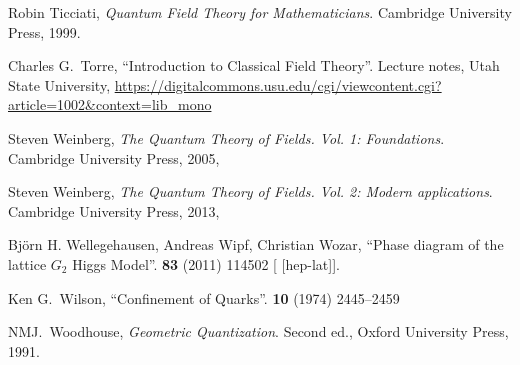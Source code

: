 \begin{thebibliography}{99}
Robin Ticciati,
\textit{Quantum Field Theory for Mathematicians}.
Cambridge University Press, 1999.

Charles G.~Torre,
``Introduction to Classical Field Theory''.
Lecture notes, Utah State University,
\url{https://digitalcommons.usu.edu/cgi/viewcontent.cgi?article=1002&context=lib_mono}





Steven Weinberg,
\textit{The Quantum Theory of Fields. Vol. 1: Foundations}.
Cambridge University Press, 2005,
{\tt{}}

Steven Weinberg,
\textit{The Quantum Theory of Fields. Vol. 2: Modern applications}.
Cambridge University Press, 2013,
{\tt{}}

Bj\"{o}rn H. Wellegehausen, Andreas Wipf, Christian Wozar,
``Phase diagram of the lattice $G_2$ Higgs Model''.
 \textbf{83} (2011) 114502
{\tt{}}
[ [hep-lat]].

Ken G.~Wilson,
``Confinement of Quarks''.
 \textbf{10} (1974) 2445--2459
{\tt{}}

NMJ.~Woodhouse,
\textit{Geometric Quantization}.
Second ed., Oxford University Press, 1991.

\end{thebibliography}

